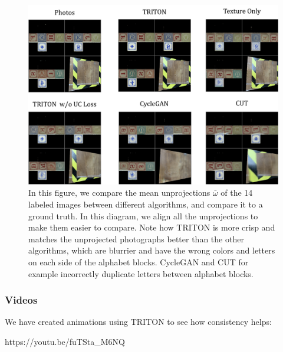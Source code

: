 		\begin{figure}[H]
			\begin{center}
				\includegraphics[width=400pt]{../images/unprojection_comparisons.pdf}
			\end{center}
			\caption{
				In this figure, we compare the mean unprojections $\bar{\omega}$ of the 14 labeled images between different algorithms, and compare it to a ground truth. In this diagram, we align all the unprojections to make them easier to compare. Note how TRITON is more crisp and matches the unprojected photographs better than the other algorithms, which are blurrier and have the wrong colors and letters on each side of the alphabet blocks. CycleGAN and CUT for example incorrectly duplicate letters between alphabet blocks.
			}
			\label{fig:unprojection_resolution_comparison}
		\end{figure}


	\subsubsection{Videos}

		We have created animations using TRITON to see how consistency helps:

		https://youtu.be/fuTSta_M6NQ
	
		


	

	




